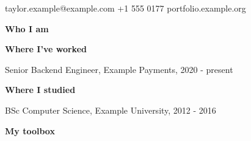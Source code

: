 \documentclass[10pt]{article}
\begin{document}
{\LARGE \Person}\par taylor.example@example.com \quad +1 555 0177 \quad portfolio.example.org\par\bigskip
\textbf{Who I am}\par \Summary\par\medskip
\textbf{Where I've worked}\par Senior Backend Engineer, Example Payments, 2020 - present\par \JobA\par \JobB\par\medskip
\textbf{Where I studied}\par BSc Computer Science, Example University, 2012 - 2016\par\medskip
\textbf{My toolbox}\par \SkillsLine\par
\end{document}
